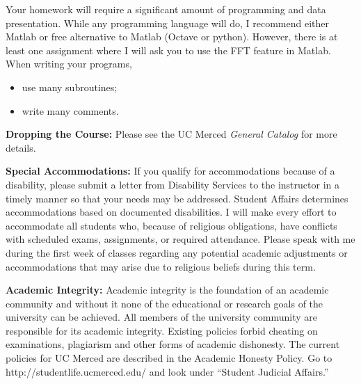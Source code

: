 \documentclass{article}
\begin{document}
Your homework will require a significant amount of programming and data
presentation.   While any programming language will do, I recommend either
Matlab or  free alternative to Matlab (Octave or python).    However, there
is at least one assignment where I will ask you to use the FFT feature in
Matlab.  When writing your programs, 

\vspace{-0.1in}
\begin{itemize}
\item use many subroutines;
\item write many comments.
\end{itemize}

\textbf{Dropping the Course:}  Please see the UC Merced \textit{General
Catalog} for more details.

\textbf{Special Accommodations:} If you qualify for accommodations
because of a disability, please submit a letter from Disability
Services to the instructor in a timely manner so that your needs may
be addressed.  Student Affairs determines accommodations based on
documented disabilities.
I will make every effort to accommodate all students who, because of
religious obligations, have conflicts with scheduled exams, assignments, or
required attendance.  Please speak with me during the first week of classes
regarding any potential academic adjustments or accommodations that may
arise due to religious beliefs during this term.

\textbf{Academic Integrity:}  Academic integrity is the foundation of an
academic community and without it none of the educational or research goals
of the university can be achieved.  All members of the university community
are responsible for its academic integrity.  Existing policies forbid
cheating on examinations, plagiarism and other forms of academic dishonesty.
The current policies for UC Merced are described in the  Academic Honesty
Policy.  Go to 
http://studentlife.ucmerced.edu/ and look under ``Student Judicial
Affairs.''
\end{document}
